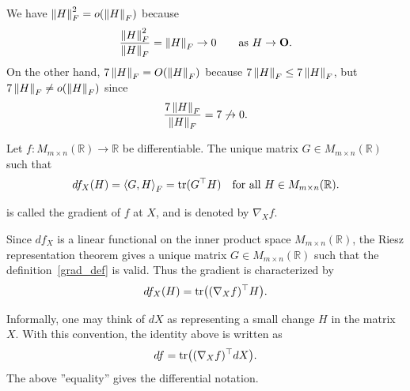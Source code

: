 \begin{example}
We have $\left\lVert H \right\rVert_F^2=o(\left\lVert H \right\rVert_F)$ because
\[
    \frac{\left\lVert H \right\rVert_F^2}{\left\lVert H \right\rVert_F}
    =
    \left\lVert H \right\rVert_F
    \to
    0
    \qquad
    \text{as }H\to \mathbf O.
\]
On the other hand, $7\left\lVert H \right\rVert_F=O(\left\lVert H \right\rVert_F)$ because
$7\left\lVert H \right\rVert_F\le 7\left\lVert H \right\rVert_F$, but $7\left\lVert H \right\rVert_F\neq o(\left\lVert H \right\rVert_F)$ since
\[
    \frac{7\left\lVert H \right\rVert_F}{\left\lVert H \right\rVert_F}
    =
    7
    \not\to
    0.
\]
\end{example}

\begin{definition}[Gradient]
Let $f:M_{m\times n}(\mathbb{R})\to\mathbb{R}$ be differentiable. 
The unique matrix $G\in M_{m\times n}(\mathbb{R})$ such that
\[
    df_X(H)=\left\langle G, H \right\rangle_F=\operatorname{tr}(G^{\top} H)
    \quad\text{for all }H\in M_{m\times n}(\mathbb{R}).
\]

is called the gradient of $f$ at $X$, and is denoted by $\nabla_X f$.
\label{grad_def}
\end{definition}

Since $df_X$ is a linear functional on the inner product space $M_{m\times n}(\mathbb{R})$, the Riesz representation theorem gives a unique matrix $G\in M_{m\times n}(\mathbb{R})$ such that the definition~\eqref{grad_def} is valid.
Thus the gradient is characterized by
\[
    df_X(H)=\operatorname{tr}\bigl((\nabla_X f)^{\top} H\bigr).
\]


Informally, one may think of $dX$ as representing a small change $H$ in the matrix $X$. With this convention, the identity above is written as
\[
    df=\operatorname{tr}\bigl((\nabla_X f)^{\top} dX\bigr).
\]
The above ''equality'' gives the differential notation.

